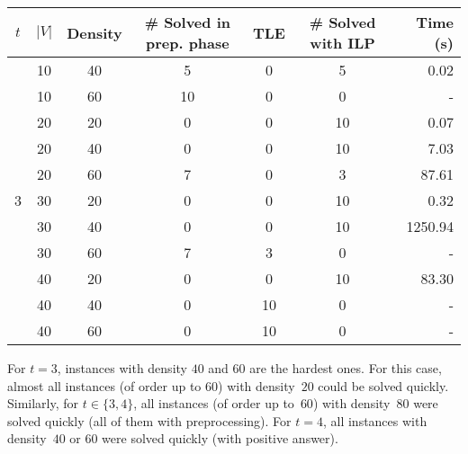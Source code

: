 \documentclass[12pt]{article}
\begin{document}
\begin{center}
\noindent
\footnotesize{
\begin{tabular}{|c|c|c|c|c|c|r|}\hline
{$t$} & {$|V|$} & {Density} & {\# Solved in prep. phase} & {TLE}  &{\# Solved
                                                           with ILP}  &{Time (s)}
\\ \hline\hline
\multirow{11}{*}{3} & 10 & 40 & 5 & 0 & 5  & 0.02 \\
& 10 & 60 & 10 & 0 & 0 & -   \\     
& 20 & 20 & 0 & 0 & 10 & 0.07 \\
& 20 & 40 & 0 & 0 & 10  & 7.03\\
& 20 & 60 & 7 & 0 & 3  & 87.61\\
& 30 & 20 & 0 & 0 & 10 & 0.32  \\
& 30 & 40 & 0 & 0 & 10  & 1250.94\\
& 30 & 60 & 7 & 3 & 0  & - \\
& 40 & 20 & 0 & 0 & 10 & 83.30\\
& 40 & 40 & 0 & 10 & 0 & -\\
& 40 & 60 & 0 & 10 & 0 & -\\
\hline\hline
\end{tabular}
}
\label{tab:exec_time}
\end{center}


For $t=3$, instances with density $40$ and $60$ are the hardest ones.
For this case, almost all instances (of order up to $60$) with
density~$20$ could be solved quickly.  Similarly, for $t\in \{3,4\}$,
all instances (of order up to~$60$) with density~$80$ were solved
quickly (all of them with preprocessing). For $t=4$, all instances
with density~$40$ or $60$ were solved quickly (with positive answer).

\end{document}
